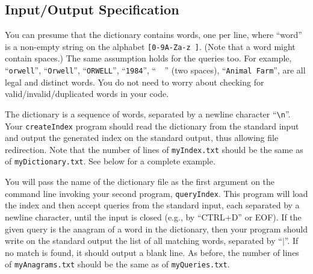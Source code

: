 \documentclass[10pt]{article}
\newcommand{\file}[1]{\texttt{#1}}
\newcommand{\code}[1]{\texttt{#1}}
\begin{document}
\subsection{Input/Output Specification}
\label{input}

You can presume that the dictionary contains words,
one per line, where ``word'' is a non-empty string on the alphabet \code{[0-9A-Za-z ]}.
(Note that a word might contain spaces.)
The same assumption holds for the queries too.
For example,
``\code{orwell}'',
``\code{Orwell}'',
``\code{ORWELL}'',
``\code{1984}'',
``\code{\ \ }'' (two spaces),
``\code{Animal Farm}'',
are all legal and distinct words.
You do not need to worry
about checking for valid/invalid/duplicated words in your code.

The dictionary is a sequence of words,
separated by a newline character ``\code{\textbackslash n}''.
Your \file{createIndex} program should read
the dictionary from the standard input
and output the generated index on the standard output,
thus allowing file redirection.
Note that the number of lines of \file{myIndex.txt}
should be the same as of \file{myDictionary.txt}.
See below for a complete example.

You will pass the name of the dictionary file
as the first argument on the command line
invoking your second program, \file{queryIndex}.
This program will load the index
and then accept queries from the standard input,
each separated by a newline character,
until the input is closed (e.g., by ``CTRL+D'' or EOF).
If the given query is the anagram of a word in the dictionary,
then your program should write on the standard output
the list of all matching words, separated by ``\code{$|$}''.
If no match is found, it should output a blank line.
As before, the number of lines of \file{myAnagrams.txt}
should be the same as of \file{myQueries.txt}.
\end{document}
